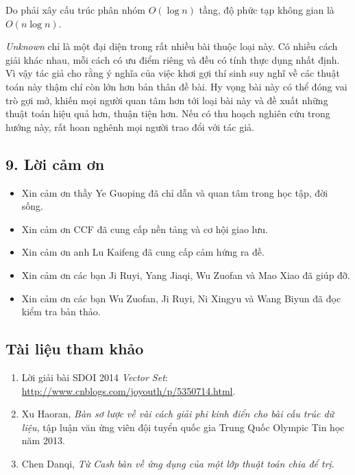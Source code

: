 \documentclass[11pt]{article}
\begin{document}
Do phải xây cấu trúc phân nhóm \(O(\log n)\) tầng, độ phức tạp không gian là
\(O(n\log n)\).

\emph{Unknown} chỉ là một đại diện trong rất nhiều bài thuộc loại này. Có
nhiều cách giải khác nhau, mỗi cách có ưu điểm riêng và đều có tính thực dụng
nhất định. Vì vậy tác giả cho rằng ý nghĩa của việc khơi gợi thí sinh suy
nghĩ về các thuật toán này thậm chí còn lớn hơn bản thân đề bài. Hy vọng bài
này có thể đóng vai trò gợi mở, khiến mọi người quan tâm hơn tới loại bài này
và đề xuất những thuật toán hiệu quả hơn, thuận tiện hơn. Nếu có thu hoạch
nghiên cứu trong hướng này, rất hoan nghênh mọi người trao đổi với tác giả.

\subsection*{9. Lời cảm ơn}

\begin{itemize}
  \item Xin cảm ơn thầy Ye Guoping đã chỉ dẫn và quan tâm trong học tập, đời
  sống.
  \item Xin cảm ơn CCF đã cung cấp nền tảng và cơ hội giao lưu.
  \item Xin cảm ơn anh Lu Kaifeng đã cung cấp cảm hứng ra đề.
  \item Xin cảm ơn các bạn Ji Ruyi, Yang Jiaqi, Wu Zuofan và Mao Xiao đã giúp
  đỡ.
  \item Xin cảm ơn các bạn Wu Zuofan, Ji Ruyi, Ni Xingyu và Wang Biyun đã đọc
  kiểm tra bản thảo.
\end{itemize}

\subsection*{Tài liệu tham khảo}

\begin{enumerate}
  \item Lời giải bài SDOI 2014 \emph{Vector Set}:
  \href{http://www.cnblogs.com/joyouth/p/5350714.html}{http://www.cnblogs.com/joyouth/p/5350714.html}.
  \item Xu Haoran, \emph{Bàn sơ lược về vài cách giải phi kinh điển cho bài
  cấu trúc dữ liệu}, tập luận văn ứng viên đội tuyển quốc gia Trung Quốc
  Olympic Tin học năm 2013.
  \item Chen Danqi, \emph{Từ Cash bàn về ứng dụng của một lớp thuật toán chia
  để trị}.
\end{enumerate}
\end{document}

